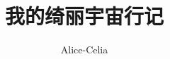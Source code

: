\documentclass[UTF8]{ctexbook}
\title{\Huge 我的绮丽宇宙行记}
\author{Alice-Celia}
\date{\zhtoday}
\begin{document}
\maketitle


\iffalse %

\section*{2023 二月}






\section*{2023 七月}



\section*{2023 八月}



\fi %



\end{document}
